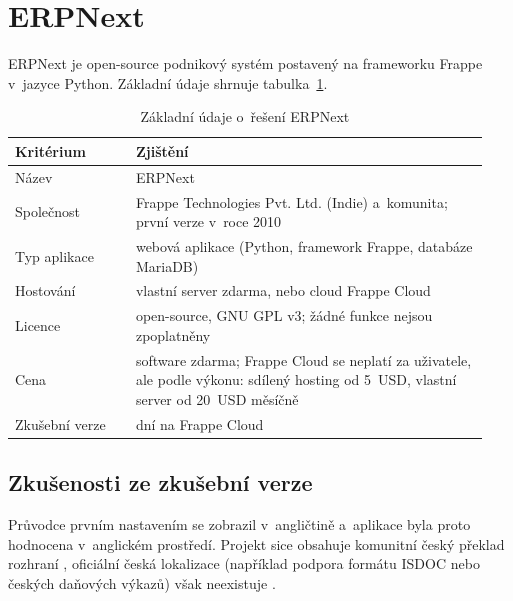 \section{ERPNext}\label{sec:reserse-erpnext}

ERPNext je open-source podnikový systém postavený na frameworku Frappe v~jazyce Python. Základní údaje shrnuje tabulka~\ref{tab:reserse-erpnext}.

\begin{table}[H]
\centering
\small
\begin{tabular}{>{\raggedright\arraybackslash}p{0.24\linewidth}>{\raggedright\arraybackslash}p{0.70\linewidth}}
\hline
\textbf{Kritérium} & \textbf{Zjištění} \\
\hline
Název & ERPNext \\
Společnost & Frappe Technologies Pvt. Ltd. (Indie) a~komunita; první verze v~roce 2010 \cite{wiki-erpnext} \\
Typ aplikace & webová aplikace (Python, framework Frappe, databáze MariaDB) \cite{wiki-erpnext,erpnext-web} \\
Hostování & vlastní server zdarma, nebo cloud Frappe Cloud \cite{erpnext-cenik} \\
Licence & open-source, GNU GPL v3; žádné funkce nejsou zpoplatněny \cite{erpnext-github,erpnext-web} \\
Cena & software zdarma; Frappe Cloud se neplatí za uživatele, ale podle výkonu: sdílený hosting od 5~USD, vlastní server od 20~USD měsíčně \cite{erpnext-cenik} \\
Zkušební verze & 14 dní na Frappe Cloud \cite{erpnext-cenik} \\
\hline
\end{tabular}
\caption{Základní údaje o~řešení ERPNext}\label{tab:reserse-erpnext}
\end{table}

\subsection{Zkušenosti ze zkušební verze}

Průvodce prvním nastavením se zobrazil v~angličtině a~aplikace byla proto hodnocena v~anglickém prostředí. Projekt sice obsahuje komunitní český překlad rozhraní \cite{erpnext-github}, oficiální česká lokalizace (například podpora formátu ISDOC nebo českých daňových výkazů) však neexistuje \cite{frappe-forum-cz}.

